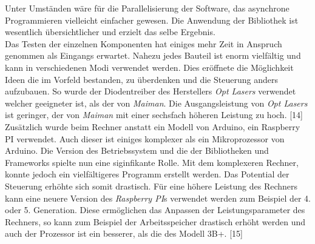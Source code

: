 Unter Umständen wäre für die Parallelisierung der Software, das asynchrone Programmieren vielleicht einfacher gewesen. Die Anwendung der Bibliothek ist wesentlich übersichtlicher und erzielt das selbe Ergebnis.\\

Das Testen der einzelnen Komponenten hat einiges mehr Zeit in Anspruch genommen als Eingangs erwartet. Nahezu jedes Bauteil ist enorm vielfältig und kann in verschiedenen Modi verwendet werden. Dies eröffnete die Möglichkeit Ideen die im Vorfeld bestanden, zu überdenken und die Steuerung anders aufzubauen. So wurde der Diodentreiber des Herstellers \textit{Opt Lasers} verwendet welcher geeigneter ist, als der von \textit{Maiman}. Die Ausgangsleistung von \textit{Opt Lasers} ist geringer, der von \textit{Maiman} mit einer sechsfach höheren Leistung zu hoch. [14]\\
Zusätzlich wurde beim Rechner anstatt ein Modell von Arduino, ein Raspberry PI verwendet. Auch dieser ist einiges komplexer als ein Mikroprozessor von Arduino. Die Version des Betriebssystem und die der Bibliotheken und Frameworks spielte nun eine siginfikante Rolle. Mit dem komplexeren Rechner, konnte jedoch ein vielfältigeres Programm erstellt werden. Das Potential der Steuerung erhöhte sich somit drastisch.
Für eine höhere Leistung des Rechners kann eine neuere Version des \textit{Raspberry PI}s verwendet werden zum Beispiel der 4. oder 5. Generation. Diese ermöglichen das Anpassen der Leistungsparameter des Rechners, so kann zum Beispiel der Arbeitsspeicher drastisch erhöht werden und auch der Prozessor ist ein besserer, als die des Modell 3B+. [15]\\